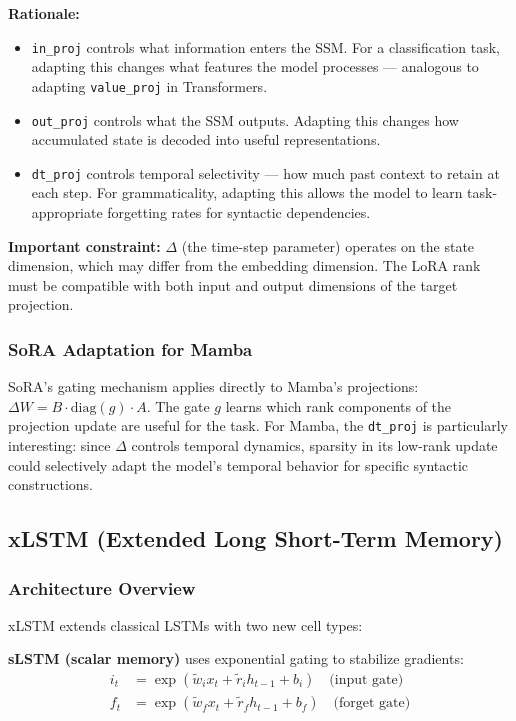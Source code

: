 \documentclass[12pt,a4paper]{article}
\theoremstyle{definition}
\begin{document}
\textbf{Rationale:}
\begin{itemize}
    \item \texttt{in\_proj} controls what information enters the SSM. For a classification task, adapting this changes what features the model processes — analogous to adapting \texttt{value\_proj} in Transformers.
    \item \texttt{out\_proj} controls what the SSM outputs. Adapting this changes how accumulated state is decoded into useful representations.
    \item \texttt{dt\_proj} controls temporal selectivity — how much past context to retain at each step. For grammaticality, adapting this allows the model to learn task-appropriate forgetting rates for syntactic dependencies.
\end{itemize}

\textbf{Important constraint:} $\Delta$ (the time-step parameter) operates on the state dimension, which may differ from the embedding dimension. The LoRA rank must be compatible with both input and output dimensions of the target projection.

\subsubsection{SoRA Adaptation for Mamba}

SoRA's gating mechanism applies directly to Mamba's projections: $\Delta W = B \cdot \text{diag}(g) \cdot A$. The gate $g$ learns which rank components of the projection update are useful for the task. For Mamba, the \texttt{dt\_proj} is particularly interesting: since $\Delta$ controls temporal dynamics, sparsity in its low-rank update could selectively adapt the model's temporal behavior for specific syntactic constructions.

\subsection{xLSTM (Extended Long Short-Term Memory)}

\subsubsection{Architecture Overview}

xLSTM \cite{beck2024xlstm} extends classical LSTMs with two new cell types:

\textbf{sLSTM (scalar memory)} uses exponential gating to stabilize gradients:
\begin{align}
i_t &= \exp(\tilde{w}_i x_t + \tilde{r}_i h_{t-1} + b_i) \quad \text{(input gate)} \\
f_t &= \exp(\tilde{w}_f x_t + \tilde{r}_f h_{t-1} + b_f) \quad \text{(forget gate)}
\end{align}
\end{document}
